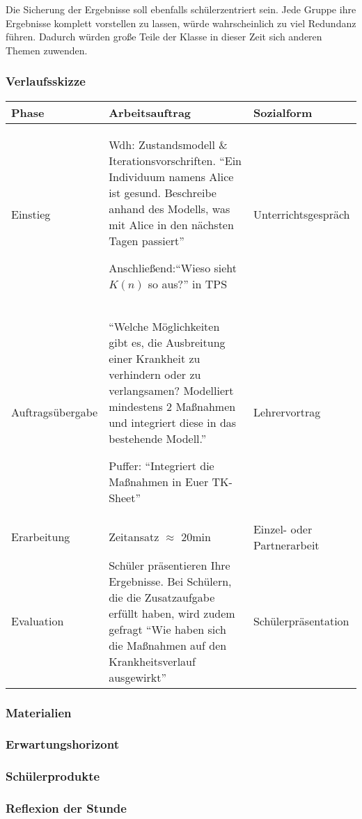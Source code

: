 Die Sicherung der Ergebnisse soll ebenfalls schülerzentriert sein. Jede Gruppe ihre Ergebnisse komplett vorstellen zu lassen, würde wahrscheinlich zu viel Redundanz führen. Dadurch würden große Teile der Klasse in dieser Zeit sich anderen Themen zuwenden. 

\begin{landscape}
\subsubsection{Verlaufsskizze}
\noindent
\begin{longtable}{|C{0.3\textwidth}|L{0.8\textwidth}|L{0.4\textwidth}|}
\hline
Phase & Arbeitsauftrag & Sozialform\\
\hline\hline
\endhead
\hline
\endfoot
Einstieg& Wdh: Zustandsmodell \& Iterationsvorschriften. ``Ein Individuum namens Alice ist gesund. Beschreibe anhand des Modells, was mit Alice in den nächsten Tagen passiert''

Anschließend:``Wieso sieht $K(n)$ so aus?'' in TPS& Unterrichtsgespräch\\\hline
Auftragsübergabe&``Welche Möglichkeiten gibt es, die Ausbreitung einer Krankheit zu verhindern oder zu verlangsamen? Modelliert mindestens 2 Maßnahmen und integriert diese in das bestehende Modell.''

Puffer: ``Integriert die Maßnahmen in Euer TK-Sheet''&Lehrervortrag\\\hline
Erarbeitung&Zeitansatz $\approx$ 20min&Einzel- oder Partnerarbeit\\\hline
Evaluation&Schüler präsentieren Ihre Ergebnisse. Bei Schülern, die die Zusatzaufgabe erfüllt haben, wird zudem gefragt ``Wie haben sich die Maßnahmen auf den Krankheitsverlauf ausgewirkt''&Schülerpräsentation\\\hline
\end{longtable}
\end{landscape}
\subsubsection{Materialien}
\subsubsection{Erwartungshorizont}
\subsubsection{Schülerprodukte}
\subsubsection{Reflexion der Stunde}